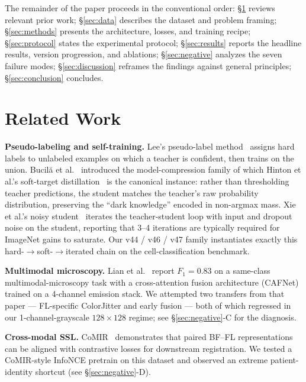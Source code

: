 \documentclass[conference]{IEEEtran}
\begin{document}
The remainder of the paper proceeds in the conventional order: \S\ref{sec:related} reviews relevant prior work; \S\ref{sec:data} describes the dataset and problem framing; \S\ref{sec:methods} presents the architecture, losses, and training recipe; \S\ref{sec:protocol} states the experimental protocol; \S\ref{sec:results} reports the headline results, version progression, and ablations; \S\ref{sec:negative} analyzes the seven failure modes; \S\ref{sec:discussion} reframes the findings against general principles; \S\ref{sec:conclusion} concludes.

\section{Related Work}
\label{sec:related}

\textbf{Pseudo-labeling and self-training.} Lee's pseudo-label method~\cite{lee2013pseudo} assigns hard labels to unlabeled examples on which a teacher is confident, then trains on the union. Bucil\u{a} et al.~\cite{bucila2006compression} introduced the model-compression family of which Hinton et al.'s soft-target distillation~\cite{hinton2015distilling} is the canonical instance: rather than thresholding teacher predictions, the student matches the teacher's raw probability distribution, preserving the ``dark knowledge'' encoded in non-argmax mass. Xie et al.'s noisy student~\cite{xie2020noisystudent} iterates the teacher-student loop with input and dropout noise on the student, reporting that 3--4 iterations are typically required for ImageNet gains to saturate. Our v44 / v46 / v47 family instantiates exactly this hard-$\rightarrow$soft-$\rightarrow$iterated chain on the cell-classification benchmark.

\textbf{Multimodal microscopy.} Lian et al.~\cite{lian2024cafnet} report $F_1 = 0.83$ on a same-class multimodal-microscopy task with a cross-attention fusion architecture (CAFNet) trained on a 4-channel emission stack. We attempted two transfers from that paper --- FL-specific ColorJitter and early fusion --- both of which regressed in our 1-channel-grayscale $128\times128$ regime; see \S\ref{sec:negative}-C for the diagnosis.

\textbf{Cross-modal SSL.} CoMIR~\cite{pielawski2020comir} demonstrates that paired BF--FL representations can be aligned with contrastive losses for downstream registration. We tested a CoMIR-style InfoNCE pretrain on this dataset and observed an extreme patient-identity shortcut (see \S\ref{sec:negative}-D).
\end{document}
